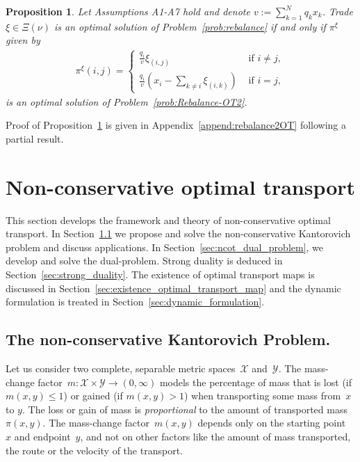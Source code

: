 \documentclass{article}
\newtheorem{proposition}[theorem]{Proposition}
\theoremstyle{definition}
\begin{document}
\begin{proposition} \label{prop:rebalance2OT}
Let Assumptions A1-A7 hold and denote $v:= \sum_{k=1}^N q_k x_k$. Trade $\xi \in \Xi(\nu)$ is an optimal solution of Problem~\ref{prob:rebalance} if and only if $\pi^\xi$ given by
\begin{align*}
\pi^\xi (i,j) = \begin{cases}
    \frac{q_i}{v} \xi_{(i,j)} & \text{ if } i \neq j, \\
    \frac{q_i}{v} \left( x_i - \sum_{k \neq i} \xi_{(i,k)} \right) & \text{ if } i = j,
\end{cases}    
\end{align*}
is an optimal solution of Problem~\ref{prob:Rebalance-OT2}. 
\end{proposition}
Proof of Proposition~\ref{prop:rebalance2OT} is given in Appendix~\ref{append:rebalance2OT} following a partial result.








\section{Non-conservative optimal transport}\label{sec:non_conservative_optimal_transport}

This section develops the framework and theory of non-conservative optimal transport. In Section~\ref{sec:nckp} we propose and solve the non-conservative Kantorovich problem and discuss applications. In Section~\ref{sec:ncot_dual_problem}, we develop and solve the dual-problem. Strong duality is deduced in Section~\ref{sec:strong_duality}. The existence of optimal transport maps is discussed in Section~\ref{sec:existence_optimal_transport_map} and the dynamic formulation is treated in Section~\ref{sec:dynamic_formulation}.



\subsection{The non-conservative Kantorovich Problem.}\label{sec:nckp}


Let us consider two complete, separable metric spaces~$\mathcal{X}$ and~$\mathcal{Y}$.  The mass-change factor~$m: \mathcal{X} \times \mathcal{Y} \to (0, \infty)$ models the percentage of mass that is lost (if $m(x,y) \leq 1$) or gained (if $m(x,y) >1$) when transporting some mass from~$x$ to $y$. The loss or gain of mass is \textit{proportional} to the amount of transported mass~$\pi(x,y)$. The mass-change factor~$m(x,y)$  depends only  on the starting point~$x$ and endpoint~$y$, and not on other factors like the amount of mass transported, the route or the velocity of the transport. 
\end{document}
